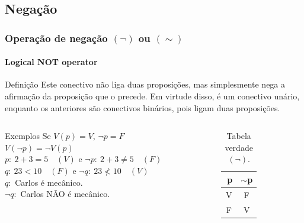 \documentclass[10pt, headsepline, captions=tableabove, xcolor=table]{beamer}
\begin{document}
\subsection{Negação}
%
\begin{frame}[t]
    \frametitle{Operação de negação $(\lnot)$ ou $(\sim)$}
    \framesubtitle{Logical NOT operator}
    \begin{block}{Definição}
        Este conectivo não liga duas proposições, mas simplesmente nega a afirmação da proposição que o precede. Em virtude disso, é um conectivo unário, enquanto os anteriores são conectivos binários, pois ligam duas proposições.
    \end{block}
    \vspace{-4mm}
    \begin{columns}[t]
        \begin{column}{0.55\textwidth}
            \small
            \begin{exampleblock}{Exemplos}
                Se $V(p) = V$, $\lnot p = F$ \\ [2pt]
                $V(\lnot p) = \lnot V(p)$ \\ [2pt]
                $p:~2+3=5\quad (V)$ e $\lnot p:~2+3 \neq 5\quad (F)$ \\ [2pt]
                $q:~23 < 10 \quad (F)$ e $\lnot q:~23 \nless 10 \quad (V)$ \\[2pt]
                $q:$ Carlos é mecânico. \\[2pt]
                $\lnot q:$ Carlos NÃO é mecânico.
            \end{exampleblock}
        \end{column}
        \hspace{-5mm}
        \begin{column}{0.4\textwidth}
            \vspace{-3mm}
            \begin{table}[t]
                \caption{Tabela verdade $(\lnot)$.}
                \label{tab:tabela-not}
                \begin{tabular}{|c|c|}
                \hline
                \rowcolor[HTML]{EFEFEF} 
                \textbf{$~$p} & \textbf{$\sim$p} \\ \hline
                V          & F                \\ \hline
                F          & V                \\ \hline
                \end{tabular}
            \end{table}
        \end{column}
    \end{columns}
\end{frame}
%
\end{document}
